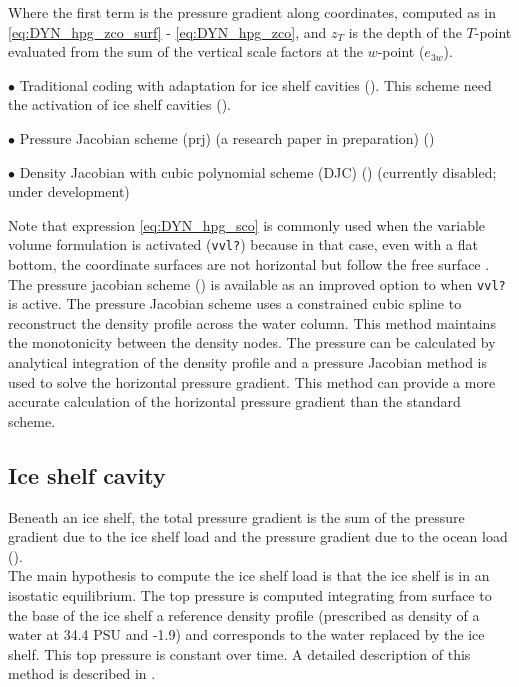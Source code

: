 \documentclass[../main/NEMO_manual]{subfiles}
\begin{document}
Where the first term is the pressure gradient along coordinates,
computed as in \autoref{eq:DYN_hpg_zco_surf} - \autoref{eq:DYN_hpg_zco},
and $z_T$ is the depth of the $T$-point evaluated from the sum of the vertical scale factors at the $w$-point
($e_{3w}$).

$\bullet$ Traditional coding with adaptation for ice shelf cavities ().
This scheme need the activation of ice shelf cavities ().

$\bullet$ Pressure Jacobian scheme (prj) (a research paper in preparation) ()

$\bullet$ Density Jacobian with cubic polynomial scheme (DJC) \citep{shchepetkin.mcwilliams_OM05}
() (currently disabled; under development)

Note that expression \autoref{eq:DYN_hpg_sco} is commonly used when the variable volume formulation is activated
(\texttt{vvl?}) because in that case, even with a flat bottom,
the coordinate surfaces are not horizontal but follow the free surface \citep{levier.treguier.ea_rpt07}.
The pressure jacobian scheme () is available as
an improved option to  when \texttt{vvl?} is active.
The pressure Jacobian scheme uses a constrained cubic spline to
reconstruct the density profile across the water column.
This method maintains the monotonicity between the density nodes.
The pressure can be calculated by analytical integration of the density profile and
a pressure Jacobian method is used to solve the horizontal pressure gradient.
This method can provide a more accurate calculation of the horizontal pressure gradient than the standard scheme.

\subsection{Ice shelf cavity}
\label{subsec:DYN_hpg_isf}

Beneath an ice shelf, the total pressure gradient is the sum of the pressure gradient due to the ice shelf load and
the pressure gradient due to the ocean load ().\\

The main hypothesis to compute the ice shelf load is that the ice shelf is in an isostatic equilibrium.
The top pressure is computed integrating from surface to the base of the ice shelf a reference density profile
(prescribed as density of a water at 34.4 PSU and -1.9) and
corresponds to the water replaced by the ice shelf.
This top pressure is constant over time.
A detailed description of this method is described in \citet{losch_JGR08}.\\
\end{document}
